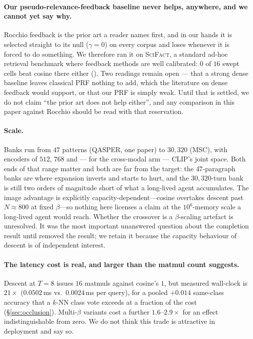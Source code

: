 \paragraph{Our pseudo-relevance-feedback baseline never helps, anywhere, and we cannot yet
say why.} Rocchio feedback is the prior art a reader names first, and in our hands it is
selected straight to its null ($\gamma{=}0$) on every corpus and loses whenever it is forced
to do something. We therefore ran it on \textsc{SciFact}, a standard ad-hoc retrieval
benchmark where feedback methods are well calibrated: $0$ of $16$ swept cells beat cosine
there either (). Two readings remain open --- that a strong dense baseline leaves
classical PRF nothing to add, which the literature on dense feedback would support, or that
our PRF is simply weak. Until that is settled, we do not claim ``the prior art does not help
either'', and any comparison in this paper against Rocchio should be read with that
reservation.

\paragraph{Scale.} Banks run from $47$ patterns (\textsc{QASPER}, one paper) to $30{,}320$
(\textsc{MSC}), with encoders of $512$, $768$ and --- for the cross-modal arm --- CLIP's
joint space. Both ends of that range matter and both are far from the target: the
$47$-paragraph banks are where expansion inverts and starts to hurt, and the
$30{,}320$-turn bank is still two orders of magnitude short of what a long-lived agent
accumulates. The image advantage is explicitly capacity-dependent---cosine overtakes
descent past $N\approx 800$ at fixed $\beta$---so nothing here licenses a claim at the
$10^6$-memory scale a long-lived agent would reach. Whether the crossover is a $\beta$-scaling
artefact is unresolved. It was the most important unanswered question about the completion
result until  removed the result; we retain it because the capacity behaviour of
descent is of independent interest.

\paragraph{The latency cost is real, and larger than the matmul count suggests.} Descent
at $T{=}8$ issues $16$ matmuls against cosine's $1$, but measured wall-clock is
$21\times$ ($0.0502$\,ms vs.\ $0.0024$\,ms per query), for a pooled $+0.014$ same-class
accuracy that a $k$-NN class vote exceeds at a fraction of the cost (\S\ref{sec:occlusion}).
Multi-$\beta$ variants cost a further $1.6$--$2.9\times$ for an effect indistinguishable
from zero. We do not think this trade is attractive in deployment and say so.

